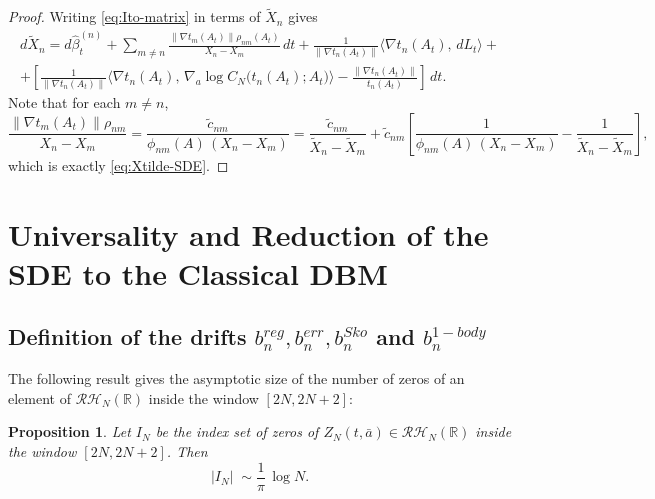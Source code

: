 \documentclass[12pt,reqno]{amsart}
\theoremstyle{plain}
\newtheorem{prop}{Proposition}[section]
\theoremstyle{definition}
\theoremstyle{remark}
\begin{document}
\begin{proof} Writing \eqref{eq:Ito-matrix} in terms of $\widetilde{X}_n$ gives 
\begin{multline}\label{eq:dXtilde-Xgaps}
d\widetilde X_n
= d\hat\beta^{(n)}_t
+\sum_{m\neq n}\frac{\big\|\nabla t_m(A_t) \big\| \rho_{nm}(A_t)}{X_n-X_m}\,dt
+\frac{1}{\big\|\nabla t_n(A_t) \big\|}\langle \nabla t_n(A_t) ,\,dL_t\rangle+ \\+\left [\frac{1}{\|\nabla t_n(A_t)\|}\Big\langle \nabla t_n(A_t),\,\nabla_a \log C_N \!\bigl(t_n(A_t);A_t\bigr)\Big\rangle
-\frac{\|\nabla t_n(A_t)\|}{t_n(A_t)}\right ] \,dt .
\end{multline}
Note that for each $m\ne n$,
\begin{equation}
\frac{\big\|\nabla t_m(A_t) \big\|  \rho_{nm}}{X_n-X_m}
=\frac{\widetilde c_{nm}}{\phi_{nm}(A)\,(X_n-X_m)}
=\frac{\widetilde c_{nm}}{\widetilde X_n-\widetilde X_m}
+\widetilde c_{nm}\!\left[\frac{1}{\phi_{nm}(A)\,(X_n-X_m)}-\frac{1}{\widetilde X_n-\widetilde X_m}\right],
\end{equation}
which is exactly \eqref{eq:Xtilde-SDE}.
\end{proof}


\section{Universality and Reduction of the SDE to the Classical DBM}
\label{s:8}

\subsection{Definition of the drifts $b^{reg}_n,b^{err}_n, b_n^{Sko}$ and $b^{1-body}_n$} 
The following result gives the asymptotic size of the number of zeros of an element of $\mathcal{RH}_N(\mathbb{R})$ inside the
window $[2N,2N+2]$: 

\begin{prop}\label{prop:size-IN}
Let $I_N$ be the index set of zeros of $Z_N(t,\bar{a}) \in \mathcal{RH}_N(\mathbb{R})$ inside the
window $[2N,2N+2]$. Then
\begin{equation}
|I_N| \;\sim  \frac{1}{\pi}\,\log N.
\end{equation}
\end{prop}
\end{document}
